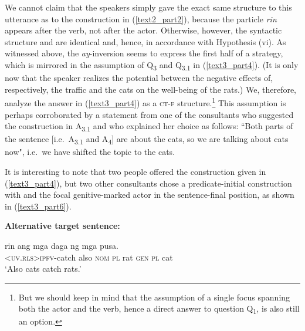 \documentclass[output=paper,
,modfonts
,nonflat]{langsci/langscibook}
\begin{document}
\noindent We cannot claim that the speakers simply gave the exact same structure to this utterance as to the  construction in (\ref{text2_part2}), because the particle \textit{rin} appears after the verb, not after the actor. Otherwise, however, the syntactic structure and  are identical and, hence, in accordance with Hypothesis (vi). As witnessed above, the \textit{ay}-inversion seems to express the first half of a   strategy, which is mirrored in the assumption of Q\textsubscript{3} and Q\textsubscript{{3.1}} in (\ref{text3_part4}). (It is only now that the speaker realizes the  potential between the negative effects of, respectively, the traffic and the cats on the well-being of the rats.) We, therefore, analyze the answer in (\ref{text3_part4}) as a \textsc{ct-f} structure.\footnote{But we should keep in mind that the assumption of a single focus spanning both the actor and the verb, hence a direct answer to question Q\textsubscript{1}, is also still an option.} This assumption is perhaps corroborated by a statement from one of the consultants who suggested the construction in A\textsubscript{{3.1}} and who explained her choice as follows: ``Both parts of the sentence [i.e.\ A\textsubscript{{3.1}} and A\textsubscript{4}] are about the cats, so we are talking about cats now", i.e.\ we have shifted the topic to the cats.

It is interesting to note that two people offered the construction given in (\ref{text3_part4}), but two other consultants chose a predicate-initial construction with  and the focal genitive-marked actor in the sentence-final position, as shown in (\ref{text3_part6}). 

\begin{exe}
\ex\label{text3_part6}\textbf{Alternative target sentence:}
\begin{xlist}
\end{xlist}
\begin{xlist}[{>}>{>}> A\textsubscript{{1.1}}:]
 rin {{\ob}ang} mga {daga{\cb}\topic} {{\ob}ng} mga {pusa{\cb}\ctopic{\cb}\sq}.\\
\textsc{\void{[[}<uv.rls>ipfv}-catch also \textsc{\void{[}nom} \textsc{pl} rat \textsc{\void{[}gen} \textsc{pl} cat\\
\glt `Also cats catch rats.'
\end{xlist}
\end{exe}
\end{document}
